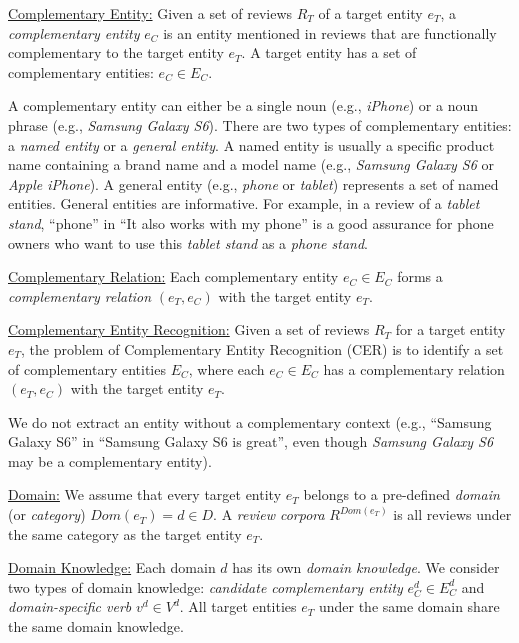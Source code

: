 \underline{Complementary Entity:} \label{defn:ce}
Given a set of reviews $R_T$ of a target entity $e_T$, a \emph{complementary entity} $e_C$ is an entity mentioned in reviews that are functionally complementary to the target entity $e_T$. A target entity has a set of complementary entities: $e_C \in E_C$.

A complementary entity can either be a single noun (e.g., \textit{iPhone}) or a noun phrase (e.g., \textit{Samsung Galaxy S6}). There are two types of complementary entities: a \emph{named entity} or a \emph{general entity}. A named entity is usually a specific product name containing a brand name and a model name (e.g., \textit{Samsung Galaxy S6} or \textit{Apple iPhone}). A general entity (e.g., \textit{phone} or \textit{tablet}) represents a set of named entities. General entities are informative. For example, in a review of a \textit{tablet stand}, ``phone'' in ``It also works with my phone'' is a good assurance for phone owners who want to use this \textit{tablet stand} as a \textit{phone stand}.

\underline{Complementary Relation:} \label{defn:cr} 
Each complementary entity $e_C \in E_C$ forms a \emph{complementary relation} $(e_T, e_C)$ with the target entity $e_T$.

\underline{Complementary Entity Recognition:} \label{defn:cee}
Given a set of reviews $R_T$ for a target entity $e_T$, the problem of Complementary Entity Recognition (CER) is to identify a set of complementary entities $E_C$, where each $e_C \in E_C$ has a complementary relation $(e_T, e_C)$ with the target entity $e_T$.

We do not extract an entity without a complementary context (e.g., ``Samsung Galaxy S6'' in ``Samsung Galaxy S6 is great'', even though \textit{Samsung Galaxy S6} may be a complementary entity).

\underline{Domain:} \label{defn:domain}
We assume that every target entity $e_T$ belongs to a pre-defined \emph{domain} (or \emph{category}) $\textit{Dom}(e_T)=d \in D$. A \emph{review corpora} $R^{\textit{Dom}(e_T)}$ is all reviews under the same category as the target entity $e_T$.

\underline{Domain Knowledge:} \label{defn:domainknowledge} 
Each domain $d$ has its own \emph{domain knowledge}. We consider two types of domain knowledge: \emph{candidate complementary entity} $e_C^d \in E_C^d$ and \emph{domain-specific verb} $v^d \in V^d$. All target entities $e_T$ under the same domain share the same domain knowledge.

